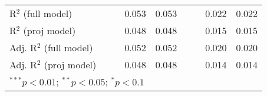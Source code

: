 \begin{sidewaystable}[h]
\begin{center}
{\begin{tabular}{l S[table-format=6.6] S[table-format=6.6] S[table-format=6.6] S[table-format=6.6] S[table-format=5.5] S[table-format=5.6] S[table-format=5.6] S[table-format=5.6]}
R$^2$ (full model)                  &              &              & 0.053        & 0.053        &             &              & 0.022        & 0.022        \\
R$^2$ (proj model)                  &              &              & 0.048        & 0.048        &             &              & 0.015        & 0.015        \\
Adj. R$^2$ (full model)             &              &              & 0.052        & 0.052        &             &              & 0.020        & 0.020        \\
Adj. R$^2$ (proj model)             &              &              & 0.048        & 0.048        &             &              & 0.014        & 0.014        \\
\bottomrule
{}
\end{tabular}}
\label{reg2}
\end{center}
\end{sidewaystable}
